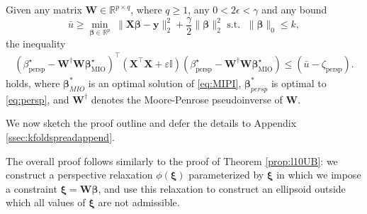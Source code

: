 \documentclass[opre,nonblindrev]{informs3} %
\begin{document}
\begin{theorem}\label{prop:kfoldspread}
	Given any matrix $\bm{W}\in \mathbb{R}^{p\times q}$, where $q \geq 1$, any $0<2\epsilon< \gamma$ and any bound
	\begin{equation*}%
			\bar u\geq \min_{\bm{\beta}\in \mathbb{R}^p}\; \|\bm{X}\bm{\beta}-\bm{y}\|_2^2+\frac{\gamma}{2}\|\bm{\beta}\|_2^2
			\text{ s.t. }\; \|\bm{\beta}\|_0\leq k,
	\end{equation*} 
	the inequality
	\begin{align}
    (\beta^\star_{\text{persp}}- \bm{W}^\dag \bm{W}\bm{\beta}^\star_{\text{MIO}})^\top \left(\bm{X}^\top \bm{X}+\varepsilon \mathbb{I}\right) (\beta^\star_{\text{persp}}- \bm{W}^\dag \bm{W}\bm{\beta}^\star_{\text{MIO}}) \leq (\bar{u}-\zeta_{\text{persp}}).
\end{align}
	holds, where $\bm{\beta}_{MIO}^*$ is an optimal solution of \eqref{eq:MIPI}, $\bm{\beta}_{persp}^*$ is optimal to \eqref{eq:persp}, and $\bm{W}^\dag$ denotes the Moore-Penrose pseudoinverse of $\bm{W}$.
\end{theorem}



We now sketch the proof outline and defer the details to Appendix \ref{ssec:kfoldspreadappend}. 

The overall proof follows similarly to the proof of Theorem \ref{prop:l10UB}: we construct a perspective relaxation $\phi(\bm{\xi})$ parameterized by $\bm{\xi}$ in which we impose a constraint $\bm{\xi}=\bm{W\beta}$, and use this relaxation to construct an ellipsoid outside which all values of $\bm{\xi}$ are not admissible.
\Halmos
\endproof
\end{document}
